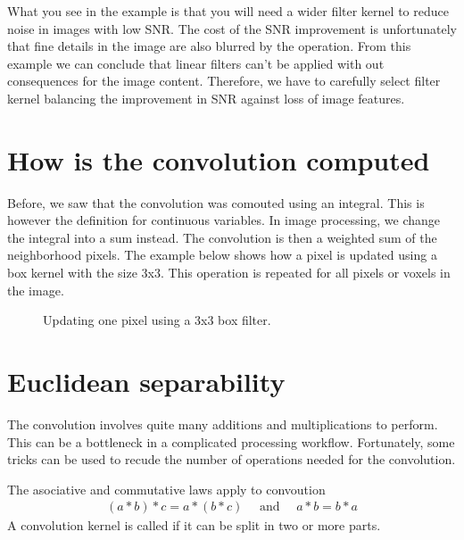 \documentclass[letterpaper,10pt,english]{sphinxmanual}
\begin{document}
\noindent{}

\sphinxAtStartPar
What you see in the example is that you will need a wider filter kernel to reduce noise in images with low SNR. The cost of the SNR improvement is unfortunately that fine details in the image are also blurred by the operation. From this example we can conclude that linear filters can’t be applied with out consequences for the image content. Therefore, we have to carefully select filter kernel balancing the improvement in SNR against loss of image features.


\section{How is the convolution computed}
\label{\detokenize{02-ImageEnhancement:how-is-the-convolution-computed}}
\sphinxAtStartPar
Before, we saw that the convolution was comouted using an integral. This is however the definition for continuous variables. In image processing, we change the integral into a sum instead. The convolution is then a weighted sum of the neighborhood pixels. The example below shows how a pixel is updated using a box kernel with the size 3x3. This operation is repeated for all pixels or voxels in the image.

\begin{figure}[htbp]
\centering
\capstart

\noindent{}
\caption{Updating one pixel using a 3x3 box filter.}\label{\detokenize{02-ImageEnhancement:id9}}\end{figure}






\section{Euclidean separability}
\label{\detokenize{02-ImageEnhancement:euclidean-separability}}
\sphinxAtStartPar
The convolution involves quite many additions and multiplications to perform. This can be a bottleneck in a complicated processing workflow. Fortunately, some tricks can be used to recude the number of operations needed for the convolution.

\sphinxAtStartPar
The asociative and commutative laws apply to convoution
\begin{equation*}
\begin{split}(a * b)*c=a*(b*c) \quad \mbox{ and } \quad a * b = b * a \end{split}
\end{equation*}
\sphinxAtStartPar
A convolution kernel is called  if it can be split in two or more parts.
\end{document}
